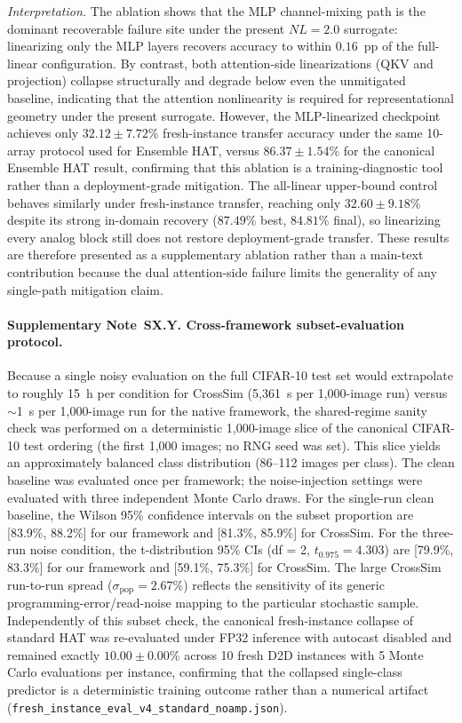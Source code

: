 \textit{Interpretation.} The ablation shows that the MLP channel-mixing path is the dominant recoverable failure site under the present $NL=2.0$ surrogate: linearizing only the MLP layers recovers accuracy to within $0.16$~pp of the full-linear configuration. By contrast, both attention-side linearizations (QKV and projection) collapse structurally and degrade below even the unmitigated baseline, indicating that the attention nonlinearity is required for representational geometry under the present surrogate. However, the MLP-linearized checkpoint achieves only $32.12\pm7.72$\% fresh-instance transfer accuracy under the same 10-array protocol used for Ensemble HAT, versus $86.37\pm1.54$\% for the canonical Ensemble HAT result, confirming that this ablation is a training-diagnostic tool rather than a deployment-grade mitigation. The all-linear upper-bound control behaves similarly under fresh-instance transfer, reaching only $32.60\pm9.18$\% despite its strong in-domain recovery ($87.49\%$ best, $84.81\%$ final), so linearizing every analog block still does not restore deployment-grade transfer. These results are therefore presented as a supplementary ablation rather than a main-text contribution because the dual attention-side failure limits the generality of any single-path mitigation claim.

\paragraph{Supplementary Note~SX.Y. Cross-framework subset-evaluation protocol.}
Because a single noisy evaluation on the full CIFAR-10 test set would extrapolate to roughly 15~h per condition for CrossSim (5,361~s per 1,000-image run) versus $\sim$1~s per 1,000-image run for the native framework, the shared-regime sanity check was performed on a deterministic 1,000-image slice of the canonical CIFAR-10 test ordering (the first 1,000 images; no RNG seed was set). This slice yields an approximately balanced class distribution (86--112 images per class). The clean baseline was evaluated once per framework; the noise-injection settings were evaluated with three independent Monte Carlo draws. For the single-run clean baseline, the Wilson 95\% confidence intervals on the subset proportion are [83.9\%, 88.2\%] for our framework and [81.3\%, 85.9\%] for CrossSim. For the three-run noise condition, the t-distribution 95\% CIs (df = 2, $t_{0.975} = 4.303$) are [79.9\%, 83.3\%] for our framework and [59.1\%, 75.3\%] for CrossSim. The large CrossSim run-to-run spread ($\sigma_{\text{pop}} = 2.67$\%) reflects the sensitivity of its generic programming-error/read-noise mapping to the particular stochastic sample. Independently of this subset check, the canonical fresh-instance collapse of standard HAT was re-evaluated under FP32 inference with autocast disabled and remained exactly $10.00\pm0.00$\% across 10 fresh D2D instances with 5 Monte Carlo evaluations per instance, confirming that the collapsed single-class predictor is a deterministic training outcome rather than a numerical artifact (\texttt{fresh\_instance\_eval\_v4\_standard\_noamp.json}).

